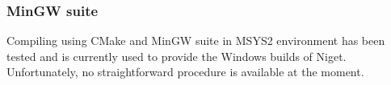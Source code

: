 



\subsubsection{MinGW suite}

Compiling using CMake and MinGW suite in MSYS2 environment has been tested and is currently used to provide the Windows builds of Niget. Unfortunately, no straightforward procedure is available at the moment.


